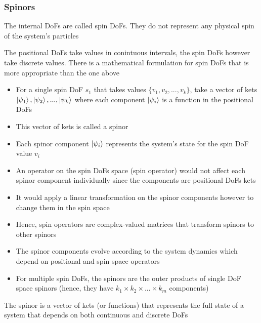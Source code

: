 \documentclass[8pt,t,mathserif,aspectratio=169]{beamer}
\begin{document}
\begin{frame}
  \frametitle{Spinors}
  \vspace{1mm}
  The internal DoFs are called spin DoFs. They do not represent any physical spin of the system's particles
  
  The positional DoFs take values in conintuous intervals, the spin DoFs however take discrete values. There is a mathematical formulation for spin DoFs that is more appropriate than the one above
  \begin{itemize}
    \item For a single spin DoF $s_1$ that takes values $\{v_1,v_2,...,v_k\}$, take a vector of kets $\ket{\psi_1},\ket{\psi_2},...,\ket{\psi_k}$ where each component $\ket{\psi_i}$ is a function in the positional DoFs
    \item This vector of kets is called a spinor
    \item Each spinor component $\ket{\psi_i}$ represents the system's state for the spin DoF value $v_i$
    \item An operator on the spin DoFs space (spin operator) would not affect each spinor component individually since the components are positional DoFs kets
    \item It would apply a linear transformation on the spinor components however to change them in the spin space
    \item Hence, spin operators are complex-valued matrices that transform spinors to other spinors
    \item The spinor components evolve according to the system dynamics which depend on positional and spin space operators
    \item For multiple spin DoFs, the spinors are the outer products of single DoF space spinors (hence, they have $k_1 \times k_2 \times ... \times k_m$ components)
  \end{itemize}
  The spinor is a vector of kets (or functions) that represents the full state of a system that depends on both continuous and discrete DoFs
\end{frame}
\end{document}
